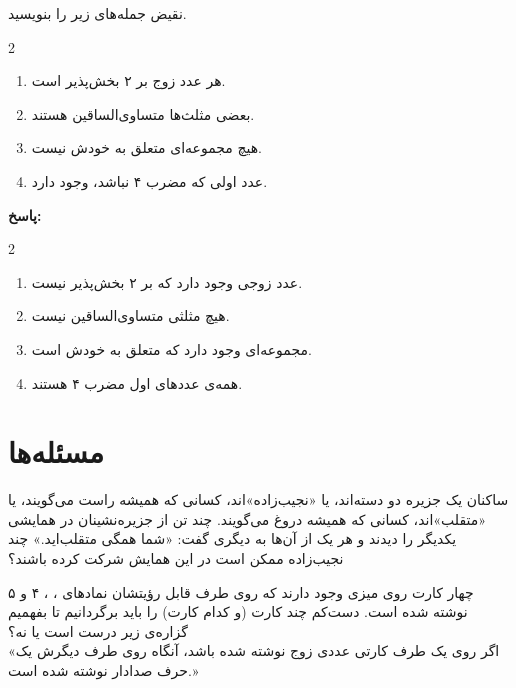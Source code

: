 \begin{example}
	نقیض جمله‌های زیر را بنویسید.
	\vspace{-0.5cm}
	\begin{multicols}{2}
		\begin{enumerate}
			\item 
			هر عدد زوج بر ۲ بخش‌پذیر است.
			\item 
			بعضی مثلث‌ها متساوی‌الساقین هستند.
			\item 
			هیچ مجموعه‌ای متعلق به خودش نیست.
			\item 
			عدد اولی که مضرب ۴ نباشد، وجود دارد.
		\end{enumerate}
	\end{multicols}
	\noindent \textbf{پاسخ:}
	\vspace{-0.5cm}
	\begin{multicols}{2}
		\begin{enumerate}
			\item 
			عدد زوجی وجود دارد که بر ۲ بخش‌پذیر نیست.
			\item 
			هیچ مثلثی متساوی‌الساقین نیست.
			\item 
			مجموعه‌ای وجود دارد که متعلق به خودش است.
			\item 
			همه‌ی عددهای اول مضرب ۴ هستند.
		\end{enumerate}
	\end{multicols}
	\vspace{0.1pt}
\end{example}
\vspace{0.5cm}
\section{مسئله‌ها}
\begin{problem} \label{lorjnzmg}
	ساکنان یک جزیره دو دسته‌اند، یا «نجیب‌زاده»‌اند، کسانی که همیشه راست می‌گویند، یا «متقلب»اند، کسانی که همیشه دروغ می‌گویند. چند تن از جزیره‌نشینان در همایشی یکدیگر را دیدند و هر یک از آن‌ها به دیگری گفت: «شما همگی متقلب‌اید.» چند نجیب‌زاده ممکن است در این همایش شرکت کرده باشند؟
\end{problem}

\begin{problem} \label{lopr4cab45}
	چهار کارت روی میزی وجود دارند که روی طرف قابل رؤیتشان نمادهای ، ، ۴ و ۵ نوشته شده است. دست‌کم چند کارت (و کدام کارت) را باید برگردانیم تا بفهمیم گزاره‌ی زیر درست است یا نه؟ \\
	«اگر روی یک طرف کارتی عددی زوج نوشته شده باشد، آنگاه روی طرف دیگرش یک حرف صدادار نوشته شده است.»
\end{problem}

